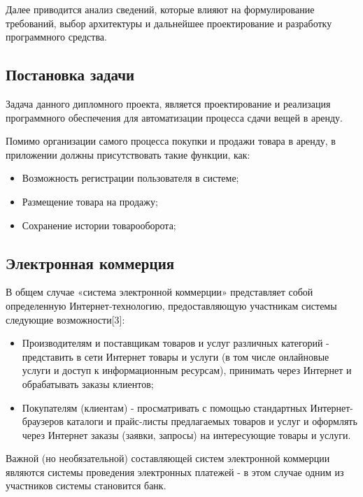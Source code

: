 Далее приводится анализ сведений, которые влияют на формулирование требований, выбор архитектуры и дальнейшее проектирование и разработку программного средства.

\subsection{Постановка задачи}

Задача данного дипломного проекта, является проектирование  и реализация программного обеспечения для автоматизации процесса сдачи вещей в аренду.

Помимо организации самого процесса покупки и продажи товара в аренду, в приложении должны присутствовать такие функции, как:
\begin{itemize}
  \item Возможность регистрации пользователя в системе;
  \item Размещение товара на продажу;
  \item Сохранение истории  товарооборота;
  \end{itemize}


\subsection{Электронная коммерция}
В общем случае «система электронной коммерции» представляет собой определенную Интернет-технологию, предоставляющую участникам системы следующие возможности[3]:
\begin{itemize}
  \item Производителям и поставщикам товаров и услуг различных категорий - представить в сети Интернет товары и услуги (в том числе онлайновые услуги и доступ к информационным ресурсам), принимать через Интернет и обрабатывать заказы клиентов;
  \item Покупателям (клиентам) - просматривать с помощью стандартных Интернет-браузеров каталоги и прайс-листы предлагаемых товаров и услуг и оформлять через Интернет заказы (заявки, запросы) на интересующие товары и услуги.
\end{itemize}

Важной (но необязательной) составляющей систем электронной коммерции являются системы проведения электронных платежей - в этом случае одним из участников системы становится банк.

